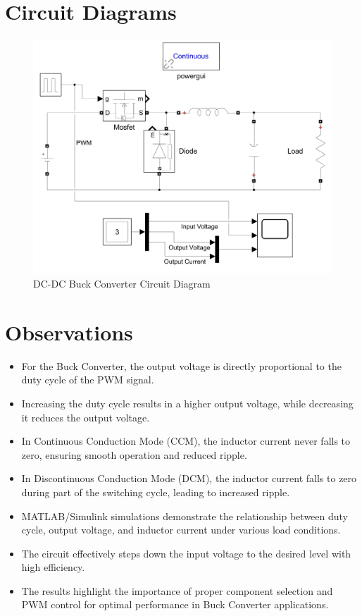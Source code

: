 \documentclass[12pt]{article}
\begin{document}
\section*{Circuit Diagrams}
\begin{figure}[H]
    \centering
    \includegraphics[width=\textwidth]{ckt.png}
    \caption{DC-DC Buck Converter Circuit Diagram}
\end{figure}

\section*{Observations}
\begin{itemize}
    \item For the Buck Converter, the output voltage is directly proportional to the duty cycle of the PWM signal.
    \item Increasing the duty cycle results in a higher output voltage, while decreasing it reduces the output voltage.
    \item In Continuous Conduction Mode (CCM), the inductor current never falls to zero, ensuring smooth operation and reduced ripple.
    \item In Discontinuous Conduction Mode (DCM), the inductor current falls to zero during part of the switching cycle, leading to increased ripple.
    \item MATLAB/Simulink simulations demonstrate the relationship between duty cycle, output voltage, and inductor current under various load conditions.
    \item The circuit effectively steps down the input voltage to the desired level with high efficiency.
    \item The results highlight the importance of proper component selection and PWM control for optimal performance in Buck Converter applications.
\end{itemize}
\end{document}
